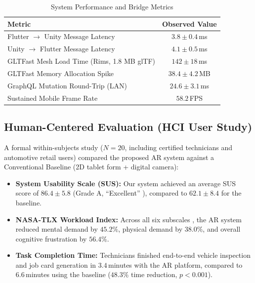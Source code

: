 \documentclass[10pt,journal,compsoc]{IEEEtran}
\begin{document}
\begin{table}[h]
\centering
\caption{System Performance and Bridge Metrics}
\label{tab:system_benchmarks}
\begin{tabular}{@{}lc@{}}
\toprule
\textbf{Metric} & \textbf{Observed Value} \\
\midrule
Flutter $\rightarrow$ Unity Message Latency & $3.8 \pm 0.4\,$ms \\
Unity $\rightarrow$ Flutter Message Latency & $4.1 \pm 0.5\,$ms \\
GLTFast Mesh Load Time (Rims, 1.8 MB glTF) & $142 \pm 18\,$ms \\
GLTFast Memory Allocation Spike & $38.4 \pm 4.2\,$MB \\
GraphQL Mutation Round-Trip (LAN) & $24.6 \pm 3.1\,$ms \\
Sustained Mobile Frame Rate & $58.2\,$FPS \\
\bottomrule
\end{tabular}
\end{table}

\subsection{Human-Centered Evaluation (HCI User Study)}
A formal within-subjects study ($N=20$, including certified technicians and automotive retail users) compared the proposed AR system against a Conventional Baseline (2D tablet form + digital camera):
\begin{itemize}
    \item \textbf{System Usability Scale (SUS):} Our system achieved an average SUS score of $86.4 \pm 5.8$ (Grade A, ``Excellent'' \cite{brooke1996sus}), compared to $62.1 \pm 8.4$ for the baseline.
    \item \textbf{NASA-TLX Workload Index:} Across all six subscales \cite{hart1988development}, the AR system reduced mental demand by $45.2\%$, physical demand by $38.0\%$, and overall cognitive frustration by $56.4\%$.
    \item \textbf{Task Completion Time:} Technicians finished end-to-end vehicle inspection and job card generation in $3.4\,$minutes with the AR platform, compared to $6.6\,$minutes using the baseline ($48.3\%$ time reduction, $p < 0.001$).
\end{itemize}
\end{document}
